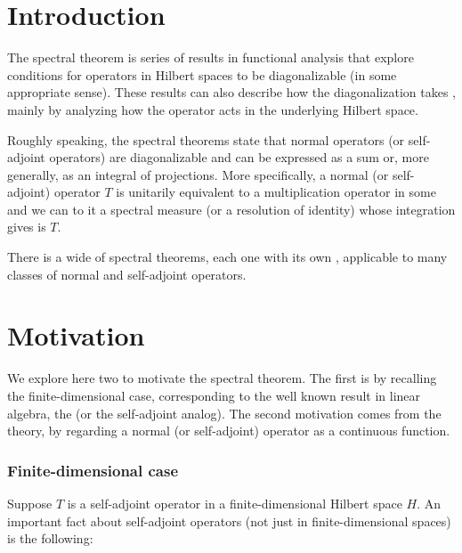 \documentclass[12pt]{article}
\begin{document}

\section{Introduction}

The spectral theorem is series of results in functional analysis that explore conditions for operators in Hilbert spaces to be diagonalizable (in some appropriate sense). These results can also describe how the diagonalization takes , mainly by analyzing how the operator acts in the underlying Hilbert space.

Roughly speaking, the spectral theorems state that normal operators (or self-adjoint operators) are diagonalizable and can be expressed as a sum or, more generally, as an integral of projections. More specifically, a normal (or self-adjoint) operator $T$ is unitarily equivalent to a multiplication operator in some  and we can  to it a spectral measure (or a resolution of identity) whose integration gives is $T$.

There is a wide  of spectral theorems, each one with its own , applicable to many classes of normal and self-adjoint operators.

\section{Motivation}

We explore here two  to motivate the spectral theorem. The first is by recalling the finite-dimensional case, corresponding to the well known result in linear algebra, the  (or the self-adjoint analog). The second motivation comes from the  theory, by regarding a normal (or self-adjoint) operator as a continuous function.

\subsubsection{Finite-dimensional case}



Suppose $T$ is a self-adjoint operator in a finite-dimensional Hilbert space $H$. An important fact about self-adjoint operators (not just in finite-dimensional spaces) is the following:
\end{document}

